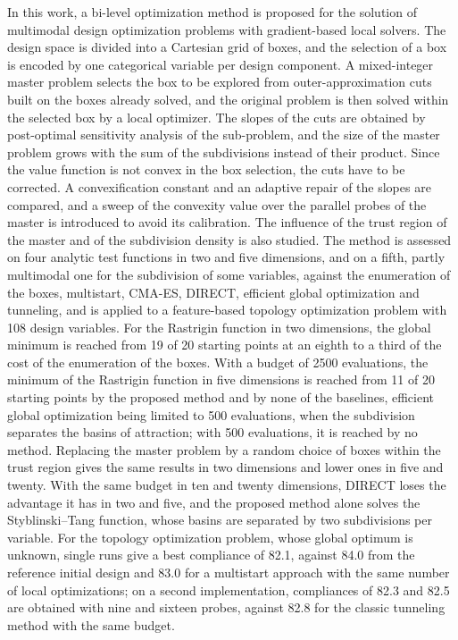 In this work, a bi-level optimization method is proposed for the solution of
multimodal design optimization problems with gradient-based local solvers. The
design space is divided into a Cartesian grid of boxes, and the selection of a
box is encoded by one categorical variable per design component. A mixed-integer
master problem selects the box to be explored from outer-approximation cuts
built on the boxes already solved, and the original problem is then solved
within the selected box by a local optimizer. The slopes of the cuts are
obtained by post-optimal sensitivity analysis of the sub-problem, and the size
of the master problem grows with the sum of the subdivisions instead of their
product. Since the value function is not convex in the box selection, the cuts
have to be corrected. A convexification constant and an adaptive repair of the
slopes are compared, and a sweep of the convexity value over the parallel probes
of the master is introduced to avoid its calibration. The influence of the
trust region of the master and of the subdivision density is also studied. The
method is assessed on four analytic test functions in two and five dimensions,
and on a fifth, partly multimodal one for the subdivision of some variables,
against the enumeration of the boxes, multistart, CMA-ES, DIRECT, efficient
global optimization and tunneling, and is applied to a feature-based topology
optimization problem with 108 design variables. For the Rastrigin function in
two dimensions, the global minimum is reached from 19 of 20 starting points at
an eighth to a third of the cost of the enumeration of the boxes. With a budget
of 2500 evaluations, the minimum of the Rastrigin function in five dimensions is
reached from 11 of 20 starting points by the proposed method and by none of the
baselines, efficient global optimization being limited to 500 evaluations, when
the subdivision separates the basins of attraction; with 500 evaluations, it is
reached by no method. Replacing the master problem by a random choice of boxes
within the trust region gives the same results in two dimensions and lower ones
in five and twenty. With the same budget in ten and twenty dimensions, DIRECT
loses the advantage it has in two and five, and the proposed method alone
solves the Styblinski--Tang function, whose basins are separated by two
subdivisions per variable. For the topology optimization problem, whose global optimum is
unknown, single runs give a best compliance of 82.1, against 84.0 from the
reference initial design and 83.0 for a multistart approach with the same
number of local optimizations; on a second implementation, compliances of 82.3
and 82.5 are obtained with nine and sixteen probes, against 82.8 for the classic
tunneling method with the same budget.
